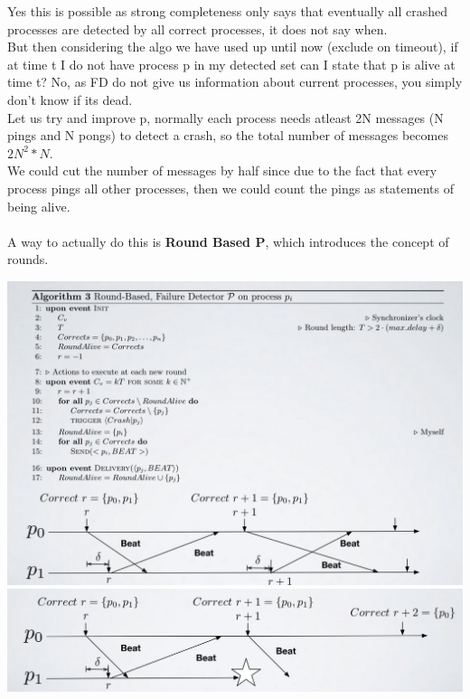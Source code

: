 \documentclass[11pt, a4paper]{article}
\begin{document}
Yes this is possible as strong completeness only says that eventually all crashed processes are detected by all correct processes, it does not say when.\\
But then considering the algo we have used up until now (exclude on timeout), if at time t I do not have process p in my detected set can I state that p is alive at time t? No, as FD do not give us information about current processes, you simply don't know if its dead.\\
Let us try and improve p, normally each process needs atleast 2N messages (N pings and N pongs) to detect a crash, so the total number of messages becomes $2N^2 * N$.\\
We could cut the number of messages by half since due to the fact that every process pings all other processes, then we could count the pings as statements of being alive.\\\\
A way to actually do this is \textbf{Round Based P}, which introduces the concept of rounds.
\begin{center}
    \includegraphics[scale=0.5]{img/FD/Round-based.png}
    \includegraphics[scale=0.5]{img/FD/Round-based-2.png}
\end{center}
\end{document}
